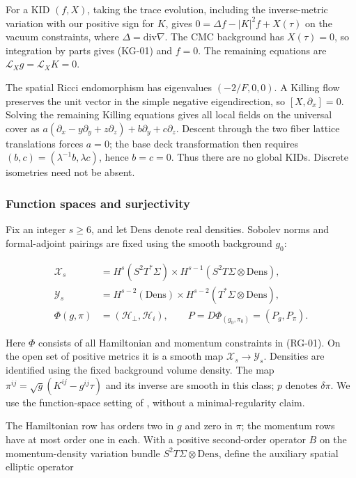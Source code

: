 For a KID $(f,X)$, taking the trace evolution, including the inverse-metric variation with our positive sign for $K$, gives $0=\Delta f-|K|^2f+X(\tau)$ on the vacuum constraints, where $\Delta=\mathrm{div}\nabla$. The CMC background has $X(\tau)=0$, so integration by parts gives (KG-01) and $f=0$. The remaining equations are $\mathcal L_Xg=\mathcal L_XK=0$.

The spatial Ricci endomorphism has eigenvalues $(-2/F,0,0)$. A Killing flow preserves the unit vector in the simple negative eigendirection, so $[X,\partial_x]=0$. Solving the remaining Killing equations gives all local fields on the universal cover as $a(\partial_x-y\partial_y+z\partial_z)+b\partial_y+c\partial_z$. Descent through the two fiber lattice translations forces $a=0$; the base deck transformation then requires $(b,c)=(\lambda^{-1}b,\lambda c)$, hence $b=c=0$. Thus there are no global KIDs. Discrete isometries need not be absent.

\subsubsection{Function spaces and surjectivity}
Fix an integer $s\ge6$, and let $\mathrm{Dens}$ denote real densities. Sobolev norms and formal-adjoint pairings are fixed using the smooth background $g_0$:

\begin{equation}\tag{SL-03}\label{eq:SL-03}
\begin{aligned}
\mathcal X_s&=H^s(S^2T^*\Sigma)\times
H^{s-1}(S^2T\Sigma\otimes\mathrm{Dens}),\\
\mathcal Y_s&=H^{s-2}(\mathrm{Dens})\times
H^{s-2}(T^*\Sigma\otimes\mathrm{Dens}),\\
\Phi(g,\pi)&=(\mathcal H_\perp,\mathcal H_i),\qquad
P=D\Phi_{(g_0,\pi_0)}=(P_g,P_\pi).
\end{aligned}
\end{equation}

Here $\Phi$ consists of all Hamiltonian and momentum constraints in (RG-01). On the open set of positive metrics it is a smooth map $\mathcal X_s\to\mathcal Y_s$. Densities are identified using the fixed background volume density. The map $\pi^{ij}=\sqrt g(K^{ij}-g^{ij}\tau)$ and its inverse are smooth in this class; $p$ denotes $\delta\pi$. We use the function-space setting of \cite[p.~155]{FischerMarsdenMoncrief1980}, without a minimal-regularity claim.

The Hamiltonian row has orders two in $g$ and zero in $\pi$; the momentum rows have at most order one in each. With a positive second-order operator $B$ on the momentum-density variation bundle $S^2T\Sigma\otimes\mathrm{Dens}$, define the auxiliary spatial elliptic operator

